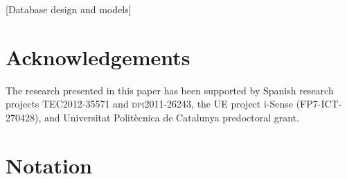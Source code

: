 \documentclass{acm_proc_article-sp}
\begin{document}
\begin{abstract}
  In this paper we define a model for multiresolution time series
  database management systems. These systems store each time series
  lossy compressed by extracting different resolutions and attribute
  aggregations. Then time series are stored compactly, with finite
  capacity and with its temporal attribute managed consistently.

  For many applications it is of primary relevance that database
  systems support time series.  We root our theory firmly on set and
  relational algebra together with some time series analysis specific
  properties that can be problematic when manipulating them.
  Furthermore, we use the time-order acquisition characteristic of
  time series to simplify its treatment by stream-like computations in
  order to achieve fast pre-computed queries and visualisations.
\end{abstract}

[Database design and models]


















\section*{Acknowledgements}

The research presented in this paper has been supported by Spanish
research projects \textsc{TEC2012-35571} and \textsc{dpi2011-26243},
the UE project i-Sense ({\small FP7-ICT-270428}), and Universitat
Polit\`{e}cnica de Catalunya predoctoral grant.



\printbibliography[
 title={REFERENCES},
]



\glsaddall
\appendix
\section{Notation}
\printglossary[type=notation,style=estil-notation,title=Name and symbol]




\end{document}
